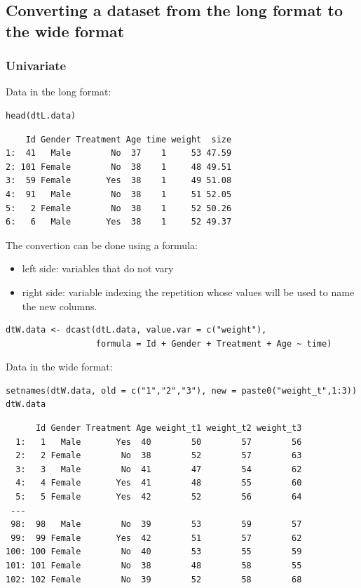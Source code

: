 \documentclass{article}
\begin{document}
\subsection{Converting a dataset from the long format to the wide format}
\label{sec:org68411b5}

\subsubsection{Univariate}
\label{sec:orgba5dafe}
Data in the long format:
\lstset{language=r,label= ,caption= ,captionpos=b,numbers=none}
\begin{lstlisting}
head(dtL.data)
\end{lstlisting}

\begin{verbatim}
    Id Gender Treatment Age time weight  size
1:  41   Male        No  37    1     53 47.59
2: 101 Female        No  38    1     48 49.51
3:  59 Female       Yes  38    1     49 51.08
4:  91   Male        No  38    1     51 52.05
5:   2 Female        No  38    1     52 50.26
6:   6   Male       Yes  38    1     52 49.37
\end{verbatim}


The convertion can be done using a formula:
\begin{itemize}
\item left side: variables that do not vary
\item right side: variable indexing the repetition whose values will be
used to name the new columns.
\end{itemize}
\lstset{language=r,label= ,caption= ,captionpos=b,numbers=none}
\begin{lstlisting}
dtW.data <- dcast(dtL.data, value.var = c("weight"),
                  formula = Id + Gender + Treatment + Age ~ time)
\end{lstlisting}

Data in the wide format:
\lstset{language=r,label= ,caption= ,captionpos=b,numbers=none}
\begin{lstlisting}
setnames(dtW.data, old = c("1","2","3"), new = paste0("weight_t",1:3))
dtW.data
\end{lstlisting}

\begin{verbatim}
      Id Gender Treatment Age weight_t1 weight_t2 weight_t3
  1:   1   Male       Yes  40        50        57        56
  2:   2 Female        No  38        52        57        63
  3:   3   Male        No  41        47        54        62
  4:   4 Female       Yes  41        48        55        60
  5:   5 Female       Yes  42        52        56        64
 ---                                                       
 98:  98   Male        No  39        53        59        57
 99:  99 Female       Yes  42        51        57        62
100: 100 Female        No  40        53        55        59
101: 101 Female        No  38        48        58        55
102: 102 Female        No  39        52        58        68
\end{verbatim}
\end{document}

